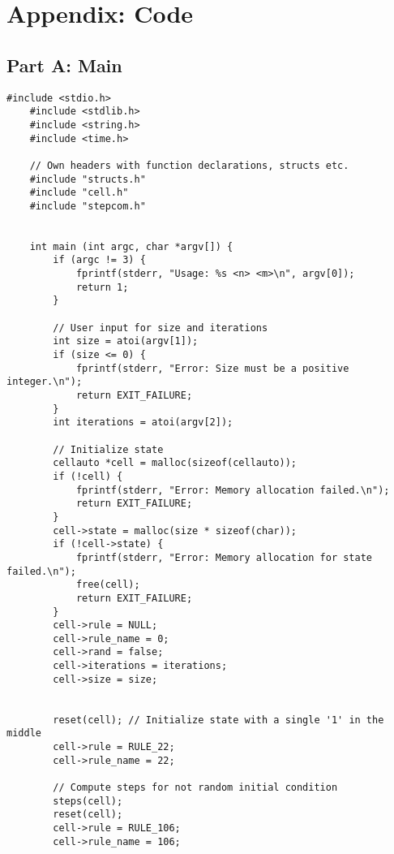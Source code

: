 \documentclass[12pt,a4paper]{article}
\begin{document}
\vspace{1cm}



\vspace{1cm}


\section{Appendix: Code}

\subsection{Part A: Main}
\begin{lstlisting}[caption={Main (1d\_states.c)},label={lst:p7001},basicstyle=\ttfamily\tiny]
    #include <stdio.h>
    #include <stdlib.h>
    #include <string.h>
    #include <time.h>

    // Own headers with function declarations, structs etc. 
    #include "structs.h"
    #include "cell.h"
    #include "stepcom.h"


    int main (int argc, char *argv[]) {
        if (argc != 3) {
            fprintf(stderr, "Usage: %s <n> <m>\n", argv[0]);
            return 1;
        }

        // User input for size and iterations
        int size = atoi(argv[1]);
        if (size <= 0) {
            fprintf(stderr, "Error: Size must be a positive integer.\n");
            return EXIT_FAILURE;
        }
        int iterations = atoi(argv[2]);

        // Initialize state
        cellauto *cell = malloc(sizeof(cellauto));
        if (!cell) {
            fprintf(stderr, "Error: Memory allocation failed.\n");
            return EXIT_FAILURE;
        }
        cell->state = malloc(size * sizeof(char));
        if (!cell->state) {
            fprintf(stderr, "Error: Memory allocation for state failed.\n");
            free(cell);
            return EXIT_FAILURE;
        }
        cell->rule = NULL; 
        cell->rule_name = 0;
        cell->rand = false;
        cell->iterations = iterations;
        cell->size = size;


        reset(cell); // Initialize state with a single '1' in the middle
        cell->rule = RULE_22;
        cell->rule_name = 22;

        // Compute steps for not random initial condition
        steps(cell);
        reset(cell); 
        cell->rule = RULE_106;
        cell->rule_name = 106;


\end{lstlisting}
\end{document}
